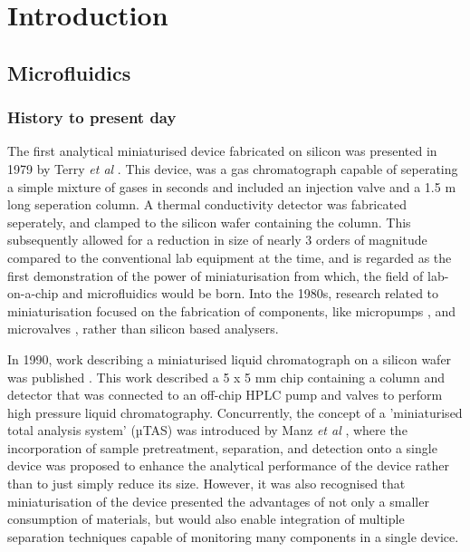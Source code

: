 
\chapter{Introduction}

\section{Microfluidics}

\subsection{History to present day}

The first analytical miniaturised device fabricated on silicon was presented in 1979 by Terry \textit{et al}
\citep{terry1979ieee}. This device, was a gas chromatograph capable of seperating a simple mixture of gases
in seconds and included an injection valve and a 1.5 m long seperation column. A thermal conductivity detector
was fabricated seperately, and clamped to the silicon wafer containing the column. This subsequently allowed for
a reduction in size of nearly 3 orders of magnitude compared to the conventional lab equipment at the time,
and is regarded \citep{reyes2002micro} as the first demonstration of the power of miniaturisation from which, the
field of lab-on-a-chip and microfluidics would be born.
Into the 1980s, research related to miniaturisation focused on the fabrication of
components, like micropumps \citep{van1988piezoelectric,van1989thermo}, and microvalves \citep{shoji1988prototype},
rather than silicon based analysers.

In 1990, work describing a miniaturised liquid chromatograph on a silicon
wafer was published \citep{manz1990design}. This work described a 5 x 5 mm chip containing a
column and detector that was connected to an off-chip HPLC pump and valves to perform high pressure
liquid chromatography. Concurrently, the concept of a 'miniaturised total analysis system' (µTAS) was introduced
by Manz \textit{et al} \citep{manz1990miniaturized}, where the incorporation of sample pretreatment, separation,
and detection onto a single device was proposed to enhance the analytical performance of the device rather
than to just simply reduce its size. However, it was also recognised that miniaturisation of the device
presented the advantages of not only a smaller consumption of materials, but would also
enable integration of multiple separation techniques capable of monitoring many components in a single device.

